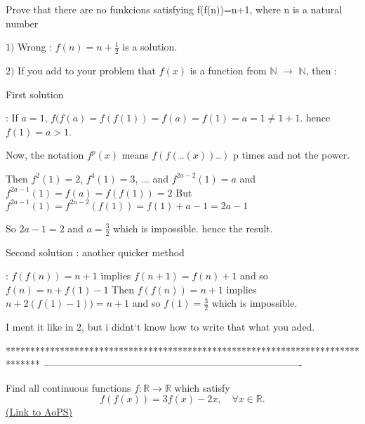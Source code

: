 \begin{mysolution}
	\begin{tcolorbox}Prove that there are no funkcions satisfying  f(f(n))=n+1,     where n is a natural number\end{tcolorbox}

$ 1)$ Wrong : $ f(n) = n + \frac {1}{2}$ is a solution.

$ 2)$ If you add to your problem that $ f(x)$ is a function from $ \mathbb{N}$ $ \rightarrow$ $ \mathbb{N}$, then :

\begin{underlined}First solution \end{underlined}:
If $ a = 1$, $ f(f(a) = f(f(1)) = f(a) = f(1) = a = 1\neq 1 + 1$. hence $ f(1) = a > 1$.

Now, the notation $ f^p(x)$ means $ f(f(..(x))..)$ p times and not the power.

Then $ f^{2}(1) = 2$, $ f^{4}(1) = 3$, ... and $ f^{2a - 2}(1) = a$ and $ f^{2a - 1}(1) = f(a) = f(f(1)) = 2$
But $ f^{2a - 1}(1) = f^{2a - 2}(f(1)) = f(1) + a - 1 = 2a - 1$

So $ 2a - 1 = 2$ and $ a = \frac {3}{2}$ which is impossible.
hence the result.

\begin{underlined}Second solution : another quicker method \end{underlined}: $ f(f(n))=n+1$ implies $ f(n+1)=f(n)+1$ and so $ f(n)=n+f(1)-1$
Then $ f(f(n))=n+1$ implies $ n+2(f(1)-1))=n+1$ and so $ f(1)=\frac{3}{2}$ which is impossible.
\end{mysolution}



\begin{mysolution}
	I ment it like in 2, but i didnt`t know how to write that what you aded.
\end{mysolution}
*******************************************************************************
-------------------------------------------------------------------------------

\begin{problem}
	Find all continuous functions $f: \mathbb R \to \mathbb R$ which satisfy
\[ f(f(x))=3f(x)-2x,\quad \forall x \in \mathbb R.\]
	\flushright \href{https://artofproblemsolving.com/community/c6h173247}{(Link to AoPS)}
\end{problem}



